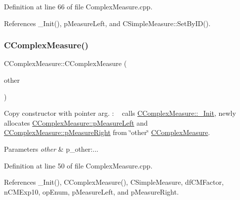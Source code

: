 Definition at line 66 of file Complex\+Measure.\+cpp.



References \+\_\+\+Init(), p\+Measure\+Left, and C\+Simple\+Measure\+::\+Set\+By\+I\+D().

\mbox{\label{classCComplexMeasure_a876e7030b4576f59ab66793ed3e7b50e}} 
\subsubsection{\texorpdfstring{C\+Complex\+Measure()}{CComplexMeasure()}\hspace{0.1cm}{\footnotesize\ttfamily [4/4]}}
{\footnotesize\ttfamily C\+Complex\+Measure\+::\+C\+Complex\+Measure (\begin{DoxyParamCaption}\item[{const \hyperlink{classCComplexMeasure}{C\+Complex\+Measure} $\ast$}]{other }\end{DoxyParamCaption})}



Copy constructor with pointer arg. \+: ~\newline
 calls \hyperlink{classCComplexMeasure_aed6efc43efe99d8cf1072ac98ec8d21c}{C\+Complex\+Measure\+::\+\_\+\+Init}, newly allocates \hyperlink{classCComplexMeasure_a4d68f86891a036df81f5b1a344c36f27}{C\+Complex\+Measure\+::p\+Measure\+Left} and \hyperlink{classCComplexMeasure_abbafc4b16676d223ed34860b8ece1b6b}{C\+Complex\+Measure\+::p\+Measure\+Right} from \char`\"{}other\char`\"{} \hyperlink{classCComplexMeasure}{C\+Complex\+Measure}. 


\begin{DoxyParams}{Parameters}
{\em other} & p\+\_\+other\+:... \\
\hline
\end{DoxyParams}


Definition at line 50 of file Complex\+Measure.\+cpp.



References \+\_\+\+Init(), C\+Complex\+Measure(), C\+Simple\+Measure, df\+C\+M\+Factor, n\+C\+M\+Exp10, op\+Enum, p\+Measure\+Left, and p\+Measure\+Right.

\mbox{\label{classCComplexMeasure_a4b6895d4eef03df92d8ea1d8ad4f2f3d}} 
